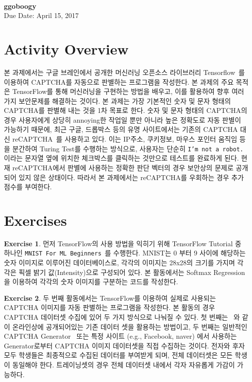 \documentclass[a4paper, 11pt]{article}
\theoremstyle{definition}
\newtheorem{exercise}{Exercise}
\begin{document}
 \\
         {\phantom{} \hfill \textbf{ggoboogy}} \\
         {\phantom{} \hfill Due Date: April 15, 2017} \\

\section{Activity Overview}
본 과제에서는 구글 브레인에서 공개한 머신러닝 오픈소스 라이브러리 Tensorflow~\cite{tensorflow}를 이용하여 CAPTCHA를 자동으로 판별하는 프로그램을 작성한다. 
본 과제의 주요 목적은 TensorFlow를 통해 머신러닝을 구현하는 방법을 배우고, 이를 활용하여 향후 여러가지 보안문제를 해결하는 것이다. 
본 과제는 가장 기본적인 숫자 및 문자 형태의 CAPTCHA를 판별해 내는 것을 1차 목표로 한다. 
숫자 및 문자 형태의 CAPTCHA의 경우 사용자에게 상당히 annoying한 작업일 뿐만 아니라 높은 정확도로 자동 판별이 가능하기 때문에, 
최근 구글, 드롭박스 등의 유명 사이트에서는 기존의 CAPTCHA 대신 reCAPTCHA~\cite{recaptcha}를 사용하고 있다. 
이는 IP주소, 쿠키정보, 마우스 포인터 움직임 등을 분간하여 Turing Test를 수행하는 방식으로, 
사용자는 단순히 \texttt{I'm not a robot.} 이라는 문자열 옆에 위치한 체크박스를 클릭하는 것만으로 테스트를 완료하게 된다.
현재 reCAPTCHA에서 판별에 사용하는 정확한 판단 벡터의 경우 보안상의 문제로 공개되어 있지 않은 상태이다. 
따라서 본 과제에서는 reCAPTCHA를 우회하는 경우 추가점수를 부여한다. 

\section{Exercises}

\begin{exercise}
먼저 TensorFlow의 사용 방법을 익히기 위해 TensorFlow Tutorial 중 하나인 \texttt{MNIST For ML Beginners}~\cite{tftutorial}를 수행한다. 
MNIST는 0 부터 9 사이에 해당하는 숫자 이미지로 이루어진 데이터베이스로, 
각각의 이미지는 28x28의 크기를 가지며 각각은 픽셀 밝기 값(Intensity)으로 구성되어 있다. 
본 활동에서는 Softmax Regression을 이용하여 각각의 숫자 이미지를 구분하는 코드를 작성한다. 
\end{exercise}

\begin{exercise}
두 번째 활동에서는 TensorFlow를 이용하여 실제로 사용되는 CAPTCHA 이미지를 자동 판별하는 프로그램을 작성한다. 
본 활동의 경우 CAPTCHA 데이터셋 수집에 있어 두 가지 방식으로 나눠질 수 있다. 
첫 번째는 ~\cite{captchaset}와 같이 온라인상에 공개되어있는 기존 데이터 셋을 활용하는 방법이고, 
두 번째는 일반적인 CAPTCHA Generator~\cite{generator1, generator2, generator3} 또는 
특정 사이트 (e.g., Facebook, naver) 에서 사용하는 Generator로부터 CAPTCHA 이미지 데이터셋을 직접 수집하는 것이다.
전자와 후자 모두 학생들은 최종적으로 수집된 데이터를 부여받게 되며, 전체 데이터셋은 모든 학생이 동일해야 한다.
트레이닝셋의 경우 전체 데이터셋 내에서 각자 자유롭게 가감이 가능하다. 
\end{exercise} 
\end{document}
